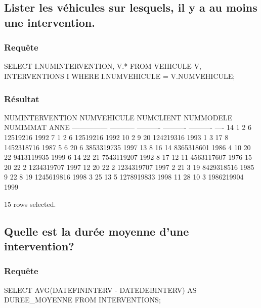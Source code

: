 \documentclass[•]{article}
\begin{document}
\subsection{Lister les véhicules sur lesquels, il y a au moins une intervention.}
\subsubsection{Requête}
\begin{sql}
SELECT I.NUMINTERVENTION, V.* FROM VEHICULE V, INTERVENTIONS I WHERE I.NUMVEHICULE = V.NUMVEHICULE;    
\end{sql}
\subsubsection{Résultat}
\begin{sql}
    NUMINTERVENTION NUMVEHICULE  NUMCLIENT  NUMMODELE   NUMIMMAT ANNE
    --------------- ----------- ---------- ---------- ---------- ----
                 14           1          2          6   12519216 1992
                  7           1          2          6   12519216 1992
                 10           2          9         20  124219316 1993
                  1           3         17          8 1452318716 1987
                  5           6         20          6 3853319735 1997
                 13           8         16         14 8365318601 1986
                  4          10         20         22 9413119935 1999
                  6          14         22         21 7543119207 1992
                  8          17         12         11 4563117607 1976
                 15          20         22          2 1234319707 1997
                 12          20         22          2 1234319707 1997
                  2          21          3         19 8429318516 1985
                  9          22          8         19 1245619816 1998
                  3          25         13          5 1278919833 1998
                 11          28         10          3 1986219904 1999
    
    15 rows selected.
\end{sql}
\subsection{Quelle est la durée moyenne d’une intervention?}
\subsubsection{Requête}
\begin{sql}
SELECT AVG(DATEFININTERV - DATEDEBINTERV) AS DUREE_MOYENNE FROM INTERVENTIONS;\end{sql}
\end{document}
